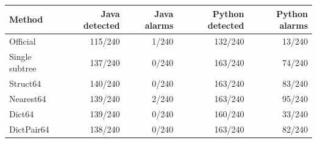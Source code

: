 \begin{tabular}{lrrrr}
\toprule
Method & Java detected & Java alarms & Python detected & Python alarms \\
\midrule
Official & 115/240 & 1/240 & 132/240 & 13/240 \\
Single subtree & 137/240 & 0/240 & 163/240 & 74/240 \\
Struct64 & 140/240 & 0/240 & 163/240 & 83/240 \\
Nearest64 & 139/240 & 2/240 & 163/240 & 95/240 \\
Dict64 & 139/240 & 0/240 & 160/240 & 33/240 \\
DictPair64 & 138/240 & 0/240 & 163/240 & 82/240 \\
\bottomrule
\end{tabular}
